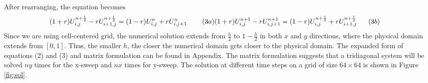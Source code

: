 After rearranging, the equation becomes 
$$
(1+r)U_{i,j}^{n+\frac{1}{2}} - rU_{i+1,j}^{n+\frac{1}{2}} = (1-r)U_{i,j}^{n} +rU_{i,j+1}^{n} \;\;\;\;\;\;\;\;(3a) 
\\
(1+r)U_{i,j}^{n+1} - rU_{i,j+1}^{n+1} = (1-r)U_{i,j}^{n+\frac{1}{2}} +rU_{i+1,j}^{n+\frac{1}{2}} \;\;\;\;\;\;(3b) 
$$
Since we are using cell-centered grid, the numerical solution extends from $\frac{h}{2}$ to $1-\frac{h}{2}$ in both $x$ and $y$ directions, where the physical domain extends from $[0,1]$. Thus, the smaller $h$, the closer the numerical domain gets closer to the physical domain. The expanded form of equations (2) and (3) and matrix formulation can be found in Appendix. The matrix formulation suggests that a tridiagonal system will be solved $ny$ times for the x-sweep and $nx$ times for y-sweep. The solution at different time steps on a grid of size $64 \times 64$ is shown in Figure \ref{fig:sol}.

